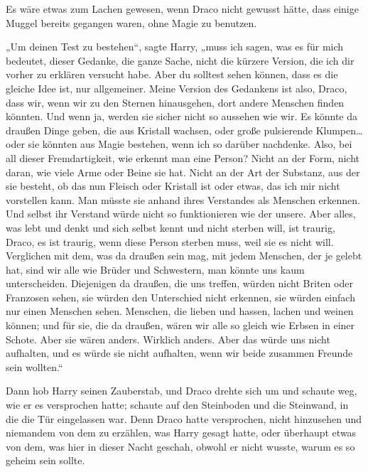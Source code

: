 {Es wäre etwas zum Lachen gewesen, wenn Draco nicht gewusst hätte, dass einige Muggel bereits gegangen waren, ohne Magie zu benutzen.

„Um deinen Test zu bestehen“, sagte Harry, „muss ich sagen, was es für mich bedeutet, dieser Gedanke, die ganze Sache, nicht die kürzere Version, die ich dir vorher zu erklären versucht habe. Aber du solltest sehen können, dass es die gleiche Idee ist, nur allgemeiner. Meine Version des Gedankens ist also, Draco, dass wir, wenn wir zu den Sternen hinausgehen, dort andere Menschen finden könnten. Und wenn ja, werden sie sicher nicht so aussehen wie wir. Es könnte da draußen Dinge geben, die aus Kristall wachsen, oder große pulsierende Klumpen… oder sie könnten aus Magie bestehen, wenn ich so darüber nachdenke. Also, bei all dieser Fremdartigkeit, wie erkennt man eine Person? Nicht an der Form, nicht daran, wie viele Arme oder Beine sie hat. Nicht an der Art der Substanz, aus der sie besteht, ob das nun Fleisch oder Kristall ist oder etwas, das ich mir nicht vorstellen kann. Man müsste sie anhand ihres Verstandes als Menschen erkennen. Und selbst ihr Verstand würde nicht so funktionieren wie der unsere. Aber alles, was lebt und denkt und sich selbst kennt und nicht sterben will, ist traurig, Draco, es ist traurig, wenn diese Person sterben muss, weil sie es nicht will. Verglichen mit dem, was da draußen sein mag, mit jedem Menschen, der je gelebt hat, sind wir alle wie Brüder und Schwestern, man könnte uns kaum unterscheiden. Diejenigen da draußen, die uns treffen, würden nicht Briten oder Franzosen sehen, sie würden den Unterschied nicht erkennen, sie würden einfach nur einen Menschen sehen. Menschen, die lieben und hassen, lachen und weinen können; und für sie, die da draußen, wären wir alle so gleich wie Erbsen in einer Schote. Aber sie wären anders. Wirklich anders. Aber das würde uns nicht aufhalten, und es würde sie nicht aufhalten, wenn wir beide zusammen Freunde sein wollten.“

Dann hob Harry seinen Zauberstab, und Draco drehte sich um und schaute weg, wie er es versprochen hatte; schaute auf den Steinboden und die Steinwand, in die die Tür eingelassen war. Denn Draco hatte versprochen, nicht hinzusehen und niemandem von dem zu erzählen, was Harry gesagt hatte, oder überhaupt etwas von dem, was hier in dieser Nacht geschah, obwohl er nicht wusste, warum es so geheim sein sollte.

}
